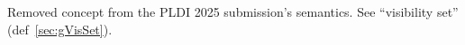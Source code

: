 
Removed concept from the PLDI 2025 submission's semantics.
See ``visibility set'' (def~\ref{sec:gVisSet}).

